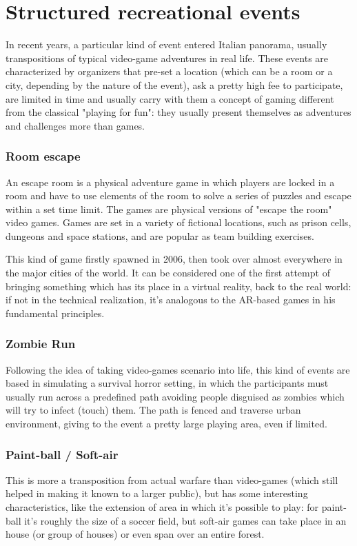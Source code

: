 	\section{Structured recreational events}
	
		In recent years, a particular kind of event entered Italian panorama, usually transpositions of typical video-game adventures in real life.
		These events are characterized by organizers that pre-set a location (which can be a room or a city, depending by the nature of the event), ask a pretty high fee to participate, are limited in time and usually carry with them a concept of gaming different from the classical "playing for fun": they usually present themselves as adventures and challenges more than games.
		
		\subsubsection{Room escape}
		
			\begin{quoting}
				An escape room is a physical adventure game in which players are locked in a room and have to use elements of the room to solve a series of puzzles and escape within a set time limit. The games are physical versions of "escape the room" video games. Games are set in a variety of fictional locations, such as prison cells, dungeons and space stations, and are popular as team building exercises.~\cite{wiki:escape}
			\end{quoting}
		
			This kind of game firstly spawned in 2006, then took over almost everywhere in the major cities of the world.
			It can be considered one of the first attempt of bringing something which has its place in a virtual reality, back to the real world: if not in the technical realization, it's analogous to the AR-based games in his fundamental principles.
		
		\subsubsection{Zombie Run}
		
			Following the idea of taking video-games scenario into life, this kind of events are based in simulating a survival horror setting, in which the participants must usually run across a predefined path avoiding people disguised as zombies which will try to infect (touch) them. The path is fenced and traverse urban environment, giving to the event a pretty large playing area, even if limited.
		
		\subsubsection{Paint-ball / Soft-air}
			
			This is more a transposition from actual warfare than video-games (which still helped in making it known to a larger public), but has some interesting characteristics, like the extension of area in which it's possible to play: for paint-ball it's roughly the size of a soccer field, but soft-air games can take place in an house (or group of houses) or even span over an entire forest.